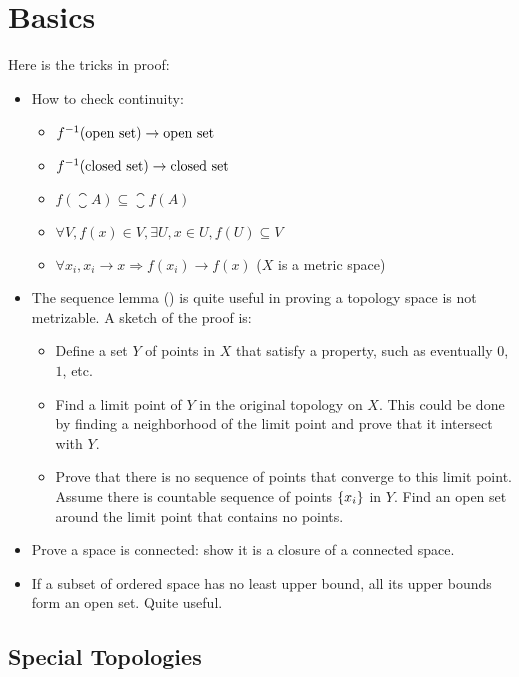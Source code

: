 \chapter{Basics}

Here is the tricks in proof:
\begin{itemize}
    \item How to check continuity:
\begin{itemize}
    \item ${f}^{-1}(\text{open set}) \rightarrow \text{open set}$
    \item ${f}^{-1}(\text{closed set}) \rightarrow \text{closed set}$
    \item $f(\closure{A}) \subseteq \closure{f(A)}$
    \item $\forall V, f(x) \in V, \exists U, x\in U, f(U) \subseteq V$
    \item $\forall x_i, x_i \rightarrow x \Rightarrow f(x_i) \rightarrow f(x)$ ($X$ is a metric space)
\end{itemize}
    \item The sequence lemma () is quite useful in proving a topology space is not metrizable. A sketch of the proof is:
    \begin{itemize}
        \item Define a set $Y$ of points in $X$ that satisfy a property, such as eventually $0$, $1$, etc.
        \item Find a limit point of $Y$ in the original topology on $X$. This could be done by finding a neighborhood of the limit point and prove that it intersect with $Y$.
        \item Prove that there is no sequence of points that converge to this limit point. Assume there is countable sequence of points $\set{x_i}$ in $Y$. Find an open set around the limit point that contains no points.
    \end{itemize}
    \item Prove a space is connected: show it is a closure of a connected space.
    \item If a subset of ordered space has no least upper bound, all its upper bounds form an open set. Quite useful.
\end{itemize}








\section{Special Topologies}

